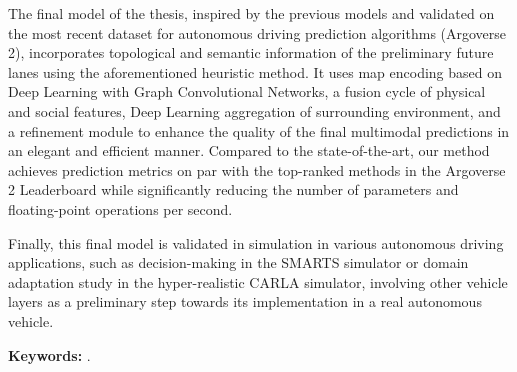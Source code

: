 The final model of the thesis, inspired by the previous models and validated on the most recent dataset for autonomous driving prediction algorithms (Argoverse 2), incorporates topological and semantic information of the preliminary future lanes using the aforementioned heuristic method. It uses map encoding based on Deep Learning with Graph Convolutional Networks, a fusion cycle of physical and social features, Deep Learning aggregation of surrounding environment, and a refinement module to enhance the quality of the final multimodal predictions in an elegant and efficient manner. Compared to the state-of-the-art, our method achieves prediction metrics on par with the top-ranked methods in the Argoverse 2 Leaderboard while significantly reducing the number of parameters and floating-point operations per second.

Finally, this final model is validated in simulation in various autonomous driving applications, such as decision-making in the SMARTS simulator or domain adaptation study in the hyper-realistic CARLA simulator, involving other vehicle layers as a preliminary step towards its implementation in a real autonomous vehicle.

\textbf{Keywords:} \myThesisKeywordsEnglish.



